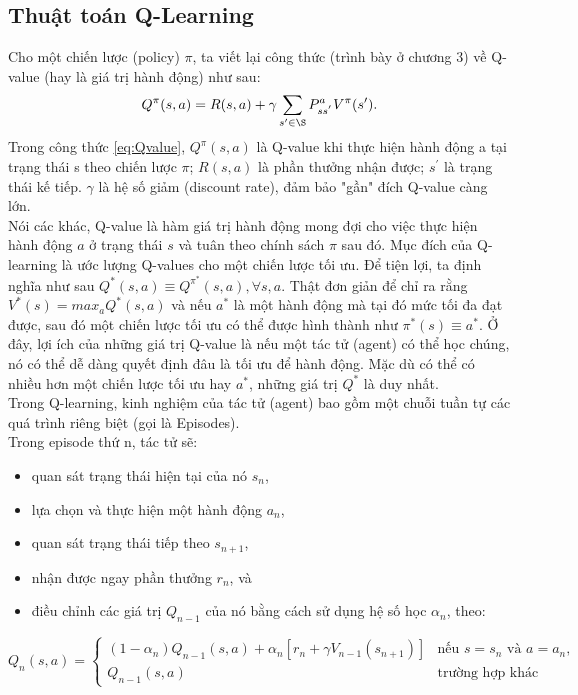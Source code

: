 \subsection{Thuật toán Q-Learning}
Cho một chiến lược (policy) $\pi$, ta viết lại công thức (trình bày ở chương 3) về Q-value (hay là giá trị hành động)
như sau:
\begin{equation} 
    \label{eq:Qvalue}
    Q^{\pi}(s,a) = R(s,a) + \gamma \sum_{s'\in \S} P_{ss^{'}}^{a}V^{\pi}(s').
\end{equation}
Trong công thức \ref{eq:Qvalue}, $Q^{\pi}(s,a)$ là Q-value khi thực hiện hành động a tại trạng thái s theo chiến lược $\pi$; $R(s,a)$ là phần thưởng nhận được; $s^{'}$ là trạng thái kế tiếp. $\gamma$ là hệ số giảm (discount rate), đảm bảo "gần" đích Q-value càng lớn.\\
Nói các khác, Q-value là hàm giá trị hành động mong đợi cho việc thực hiện hành động $a$ ở trạng thái $s$ và tuân theo chính sách $\pi$ sau đó. 
 Mục đích của Q-learning là ước lượng Q-values cho một chiến lược tối ưu. Để tiện lợi, ta định nghĩa như sau 
 $Q^{*}(s,a) \equiv Q^{\pi^{*}}(s,a), \forall s, a$. Thật đơn giản để chỉ ra rằng
  $V^{*}(s) = max_{a} Q^{*}(s,a)$ và nếu $a^{*}$ là một hành động mà tại đó
  mức tối đa đạt được, sau đó một chiến lược tối ưu có thể được hình thành như $\pi^{*}(s) \equiv a^{*}$.
  Ở đây, lợi ích của những giá trị Q-value là nếu một tác tử (agent) có thể học chúng, nó có thể 
  dễ dàng quyết định đâu là tối ưu để hành động. Mặc dù có thể có nhiều hơn một chiến lược tối ưu hay 
  $a^{*}$, những giá trị $Q^{*}$ là duy nhất.\\
  \indent Trong Q-learning,  kinh nghiệm của tác tử (agent) bao gồm một chuỗi tuần tự các quá trình riêng biệt (gọi là Episodes).\\
  Trong episode thứ n, tác tử sẽ:
\begin{itemize}
    \item quan sát trạng thái hiện tại của nó $s_n$,
    \item lựa chọn và thực hiện một hành động $a_n$,
    \item quan sát trạng thái tiếp theo $s_{n+1}$,
    \item nhận được ngay phần thưởng $r_n$, và
    \item điều chỉnh các giá trị $Q_{n-1}$ của nó bằng cách sử dụng hệ số học $\alpha_{n}$, theo:
\end{itemize}
\begin{equation} 
Q_{n}(s,a) =  \begin{cases}
    (1-\alpha_n)Q_{n-1}(s,a) + \alpha_{n}[r_n + \gamma V_{n-1}(s_{n+1})] &\text{nếu } s = s_n \text{ và } a = a_n,\\
    Q_{n-1}(s, a) &\text{trường hợp khác}
\end{cases}   
\end{equation}
